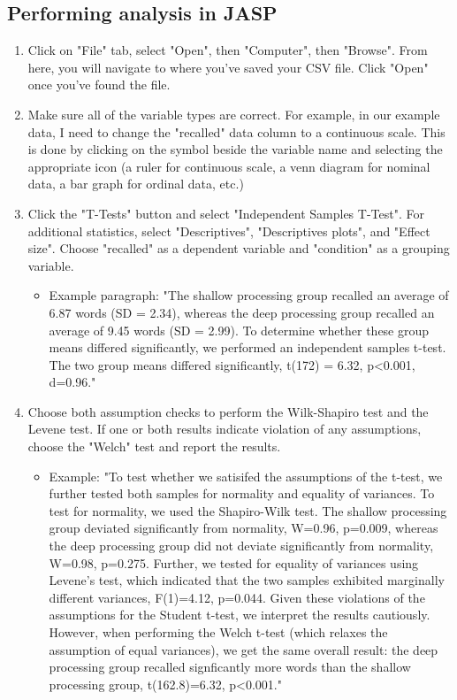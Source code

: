 \documentclass[11pt]{article}
\begin{document}
\subsection*{Performing analysis in JASP}
\label{sec-2-3}
\begin{enumerate}
\item Click on "File" tab, select "Open", then "Computer", then "Browse".  From here, you will navigate to where you've saved your CSV file.  Click "Open" once you've found the file.

\item Make sure all of the variable types are correct.  For example, in our example data, I need to change the "recalled" data column to a continuous scale.  This is done by clicking on the symbol beside the variable name and selecting the appropriate icon (a ruler for continuous scale, a venn diagram for nominal data, a bar graph for ordinal data, etc.)

\item Click the "T-Tests" button and select "Independent Samples T-Test".  For additional statistics, select "Descriptives", "Descriptives plots", and "Effect size".  Choose "recalled" as a dependent variable and "condition" as a grouping variable.
\begin{itemize}
\item Example paragraph: "The shallow processing group recalled an average of 6.87 words (SD = 2.34), whereas the deep processing group recalled an average of 9.45 words (SD = 2.99).  To determine whether these group means differed significantly, we performed an independent samples t-test.  The two group means differed significantly, t(172) = 6.32, p<0.001, d=0.96."
\end{itemize}

\item Choose both assumption checks to perform the Wilk-Shapiro test and the Levene test.  If one or both results indicate violation of any assumptions, choose the "Welch" test and report the results.
\begin{itemize}
\item Example: "To test whether we satisifed the assumptions of the t-test, we further tested both samples for normality and equality of variances.  To test for normality, we used the Shapiro-Wilk test.  The shallow processing group deviated significantly from normality, W=0.96, p=0.009, whereas the deep processing group did not deviate significantly from normality, W=0.98, p=0.275.  Further, we tested for equality of variances using Levene's test, which indicated that the two samples exhibited marginally different variances, F(1)=4.12, p=0.044.  Given these violations of the assumptions for the Student t-test, we interpret the results cautiously.   However, when performing the Welch t-test (which relaxes the assumption of equal variances), we get the same overall result: the deep processing group recalled signficantly more words than the shallow processing group, t(162.8)=6.32, p<0.001."
\end{itemize}
\end{enumerate}
\end{document}

